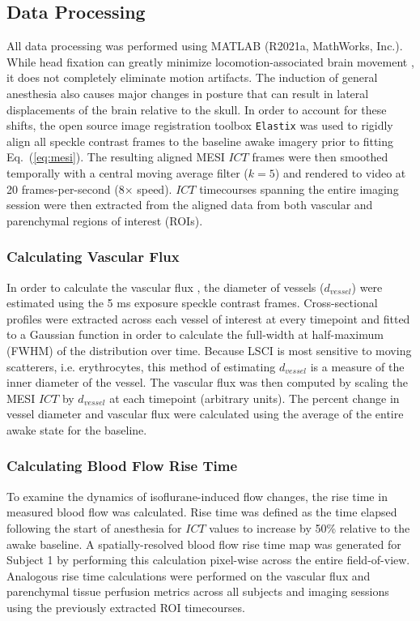 \documentclass[review]{elsarticle}
\begin{document}

\subsection{Data Processing}

All data processing was performed using MATLAB (R2021a, MathWorks, Inc.). While head fixation can greatly minimize locomotion-associated brain movement \cite{Dombeck:2007gr}, it does not completely eliminate motion artifacts. The induction of general anesthesia also causes major changes in posture that can result in lateral displacements of the brain relative to the skull. In order to account for these shifts, the open source image registration toolbox \texttt{Elastix} \cite{Klein:2010gr} was used to rigidly align all speckle contrast frames to the baseline awake imagery prior to fitting Eq.~(\ref{eq:mesi}). The resulting aligned MESI $ICT$ frames were then smoothed temporally with a central moving average filter ($k=5$) and rendered to video at 20 frames-per-second (8$\times$ speed). $ICT$ timecourses spanning the entire imaging session were then extracted from the aligned data from both vascular and parenchymal regions of interest (ROIs).

\subsubsection{Calculating Vascular Flux}
In order to calculate the vascular flux \cite{Kazmi:2015du}, the diameter of vessels ($d_{vessel}$) were estimated using the 5 ms exposure speckle contrast frames. Cross-sectional profiles were extracted across each vessel of interest at every timepoint and fitted to a Gaussian function in order to calculate the full-width at half-maximum (FWHM) of the distribution over time. Because LSCI is most sensitive to moving scatterers, i.e. erythrocytes, this method of estimating $d_{vessel}$ is a measure of the inner diameter of the vessel. The vascular flux was then computed by scaling the MESI $ICT$ by $d_{vessel}$ at each timepoint (arbitrary units). The percent change in vessel diameter and vascular flux were calculated using the average of the entire awake state for the baseline.

\subsubsection{Calculating Blood Flow Rise Time}
To examine the dynamics of isoflurane-induced flow changes, the rise time in measured blood flow was calculated. Rise time was defined as the time elapsed following the start of anesthesia for $ICT$ values to increase by 50\% relative to the awake baseline. A spatially-resolved blood flow rise time map was generated for Subject 1 by performing this calculation pixel-wise across the entire field-of-view. Analogous rise time calculations were performed on the vascular flux and parenchymal tissue perfusion metrics across all subjects and imaging sessions using the previously extracted ROI timecourses.
\end{document}
